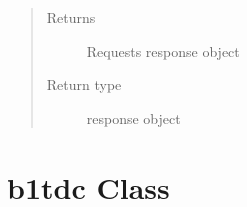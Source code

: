 \documentclass[letterpaper,10pt,english]{sphinxmanual}
\begin{document}
\begin{fulllineitems}
\begin{fulllineitems}
\begin{quote}
\begin{description}
\begin{itemize}
\end{itemize}

\item[{Returns}] \leavevmode
\sphinxAtStartPar
Requests response object

\item[{Return type}] \leavevmode
\sphinxAtStartPar
response object

\end{description}\end{quote}

\end{fulllineitems}


\end{fulllineitems}



\section{b1tdc Class}
\label{\detokenize{b1tdc-class:b1tdc-class}}\label{\detokenize{b1tdc-class::doc}}
\end{document}
